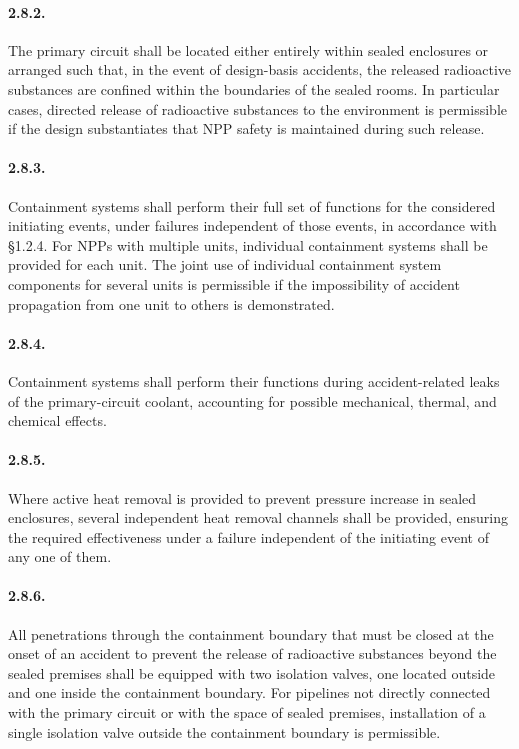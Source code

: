 \documentclass[openright]{bookest}
\begin{document}
\paragraph{2.8.2.}
The primary circuit shall be located either entirely within sealed enclosures or arranged such that, in the event of design-basis accidents, the released radioactive substances are confined within the boundaries of the sealed rooms.  
In particular cases, directed release of radioactive substances to the environment is permissible if the design substantiates that NPP safety is maintained during such release.

\paragraph{2.8.3.}
Containment systems shall perform their full set of functions for the considered initiating events, under failures independent of those events, in accordance with §1.2.4.  
For NPPs with multiple units, individual containment systems shall be provided for each unit.  
The joint use of individual containment system components for several units is permissible if the impossibility of accident propagation from one unit to others is demonstrated.

\paragraph{2.8.4.}
Containment systems shall perform their functions during accident-related leaks of the primary-circuit coolant, accounting for possible mechanical, thermal, and chemical effects.

\paragraph{2.8.5.}
Where active heat removal is provided to prevent pressure increase in sealed enclosures, several independent heat removal channels shall be provided, ensuring the required effectiveness under a failure independent of the initiating event of any one of them.

\paragraph{2.8.6.}
All penetrations through the containment boundary that must be closed at the onset of an accident to prevent the release of radioactive substances beyond the sealed premises shall be equipped with two isolation valves, one located outside and one inside the containment boundary.  
For pipelines not directly connected with the primary circuit or with the space of sealed premises, installation of a single isolation valve outside the containment boundary is permissible.
\end{document}
